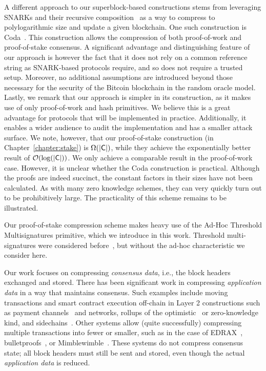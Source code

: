 A different approach to our superblock-based constructions stems from leveraging
SNARKs and their recursive composition~\cite{snarks,recursive-snarks} as a way
to compress to polylogarithmic size and update a given blockchain.
One such construction is Coda~\cite{coda}. This construction allows the
compression of both proof-of-work and proof-of-stake consensus. A significant
advantage and distinguishing feature of our approach is however the fact that it
does not rely on a common reference string as SNARK-based protocols require, and
so does not require a trusted setup. Moreover, no additional assumptions are
introduced beyond those necessary for the security of the Bitcoin blockchain in
the random oracle model. Lastly, we remark that our approach is simpler in its
construction, as it makes use of only proof-of-work and hash primitives. We
believe this is a great advantage for protocols that will be implemented
in practice. Additionally, it enables a wider audience to audit the
implementation and has a smaller attack surface. We note, however, that our
proof-of-stake construction (in Chapter~\ref{chapter:stake}) is
$\Omega(|\mathsf{C}|)$, while they achieve the exponentially better result of
$\mathcal{O}(\log(|\mathsf{C}|))$. We only achieve a comparable result in the
proof-of-work case. However, it is unclear whether the Coda construction is
practical. Although the proofs are indeed succinct, the constant factors in
their sizes have not been calculated. As with many zero knowledge schemes, they
can very quickly turn out to be prohibitively large. The practicality of this
scheme remains to be illustrated.

Our proof-of-stake compression scheme makes heavy use of the Ad-Hoc Threshold
Multisignatures primitive, which we introduce in this work. Threshold
multi-signatures were considered before~\cite{pass-asynchronous}, but  without
the ad-hoc characteristic we consider here.

Our work focuses on compressing \emph{consensus data},
i.e., the block headers exchanged and stored. There has been significant
work in compressing \emph{application data} in a way that maintains consensus.
Such examples include moving transactions and smart contract execution off-chain
in Layer 2 constructions such as payment channels~\cite{lightning,composable-lightning,brick,cerberus}
and networks, rollups of
the optimistic~\cite{truebit} or zero-knowledge~\cite{starks} kind, and
sidechains~\cite{plasma,plasma,pow-sidechains,pos-sidechains}.
Other systems allow (quite successfully) compressing multiple transactions
into fewer or smaller, such as in the case of EDRAX~\cite{edrax},
bulletproofs~\cite{bulletproofs}, or Mimblewimble~\cite{mimblewimble}. These systems do not compress
consensus state; all block headers must still be sent and stored,
even though the actual \emph{application data} is reduced.


